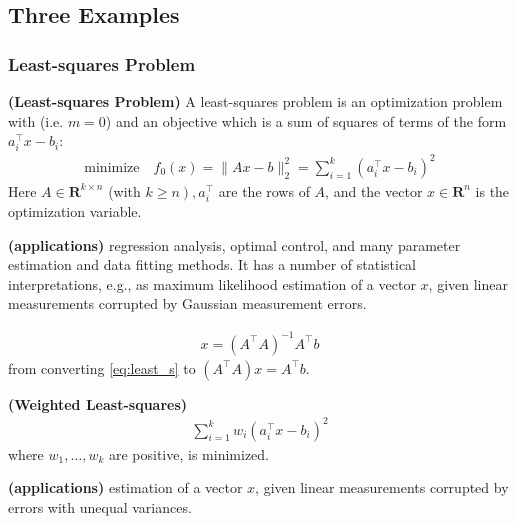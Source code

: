 \documentclass{article}
\newcommand{\bfs}[1]{\textbf{({#1}) }}
\begin{document}
 \subsection{Three Examples}
 \subsubsection{Least-squares Problem}
\begin{defa}{\bfs{Least-squares Problem}}
 A least-squares problem is an optimization problem with  (i.e. $m=0$) and an objective which is a sum of squares of terms of the form $a_{i}^{\top} x-b_{i}$:
\begin{align}
\text{minimize} \quad f_{0}(x)=\|A x-b\|_{2}^{2}=\sum_{i=1}^{k}\left(a_{i}^{\top} x-b_{i}\right)^{2} \label{eq:least_s}
\end{align}
Here $A \in \mathbf{R}^{k \times n}$ (with $\left.k \geq n\right), a_{i}^{\top}$ are the rows of $A$, and the vector $x \in \mathbf{R}^{n}$ is the optimization variable.
\end{defa}
\begin{rema}{\bfs{applications}}
regression analysis, optimal control, and many parameter estimation and data fitting methods. It has a number of statistical interpretations, e.g., as maximum likelihood estimation of a vector $x$, given linear measurements corrupted by Gaussian measurement errors.
\end{rema}

\begin{align*}
x=\left(A^{\top} A\right)^{-1} A^{\top} b 
\end{align*}
from converting \cref{eq:least_s} to $\left(A^{\top} A\right) x=A^{\top} b$.
\begin{defa}{\bfs{Weighted Least-squares}}
 \begin{align}
\sum_{i=1}^{k} w_{i}\left(a_{i}^{\top} x-b_{i}\right)^{2} \label{eq:wei}
\end{align}
where $w_{1}, \ldots, w_{k}$ are positive, is minimized. 
\end{defa}
\begin{rema}{\bfs{applications}}
estimation of a vector $x$, given linear measurements corrupted by errors with unequal variances.
\end{rema} 
\end{document}
